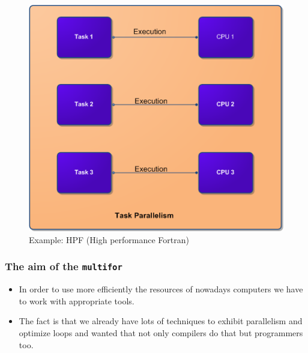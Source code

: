 \documentclass{beamer}
\begin{document}
\begin{frame}
\begin{figure}[h]
\begin{minipage}[t]{0.30\textwidth}
\centering
\includegraphics[width=\textwidth]{pictures/task-parallelism}
 \\
Example: HPF (High performance Fortran)
\end{minipage}

\end{figure}

\end{frame}


\begin{frame}
\frametitle{The aim of the \texttt{multifor}}

\begin{itemize}

\item In order to use more efficiently the resources of nowadays computers we have to work with appropriate tools.

\item The fact is that we already have lots of techniques to exhibit parallelism and optimize loops and wanted that not only compilers do that but programmers too.

\end{itemize}

\end{frame}

\end{document}
